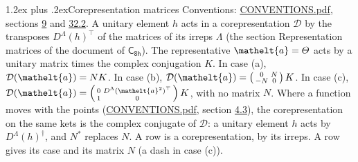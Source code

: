 \documentclass[10pt,a4paper]{article}
\makeatletter
\renewcommand\section{\@startsection{section}{1}{\z@}{-3ex plus -1ex minus -.2ex}%
  {1.2ex plus .2ex}{\normalfont\large\sffamily\bfseries\color{parttitle}}}
\numberwithin{equation}{section}
\newcommand{\eltfont}[1]{{\let\sigma\eltsigma\mathelt{#1}}}
\newcommand{\grp}[1]{\mathsf{#1}}
\newcommand{\elt}[1]{\eltfont{#1}}
\makeatother
\begin{document}
\section{Corepresentation matrices}\label{s:corep_matrices}
Conventions: \href{../../CONVENTIONS.pdf}{CONVENTIONS.pdf}, sections \href{../../../rotation/CONVENTIONS.pdf\#conv.9}{9} and \href{../../CONVENTIONS.pdf\#conv.32.2}{32.2}.
A unitary element $h$ acts in a corepresentation $\mathcal{D}$ by the transposes $D^{\Lambda}(h)^{\top}$ of the matrices of its irreps $\Lambda$ (the section Representation matrices of the document of \href{../../../rotation/data/pdf/C8h.pdf}{$\grp{C_{8h}}$}). The representative $\elt{a} = \varTheta$ acts by a unitary matrix times the complex conjugation $K$.
In case (a), $\mathcal{D}(\elt{a}) = NK$. In case (b), $\mathcal{D}(\elt{a}) = \left(\begin{smallmatrix} 0 & N \\ -N & 0 \end{smallmatrix}\right) K$. In case (c), $\mathcal{D}(\elt{a}) = \left(\begin{smallmatrix} 0 & D^{\Lambda}(\elt{a}^2)^{\top} \\ 1 & 0 \end{smallmatrix}\right) K$, with no matrix $N$.
Where a function moves with the points (\href{../../CONVENTIONS.pdf}{CONVENTIONS.pdf}, section \href{../../../rotation/CONVENTIONS.pdf\#conv.4.3}{4.3}), the corepresentation on the same kets is the complex conjugate of $\mathcal{D}$: a unitary element $h$ acts by $D^{\Lambda}(h)^{\dagger}$, and $N^{*}$ replaces $N$.
A row is a corepresentation, by its irreps. A row gives its case and its matrix $N$ (a dash in case (c)).
\end{document}
